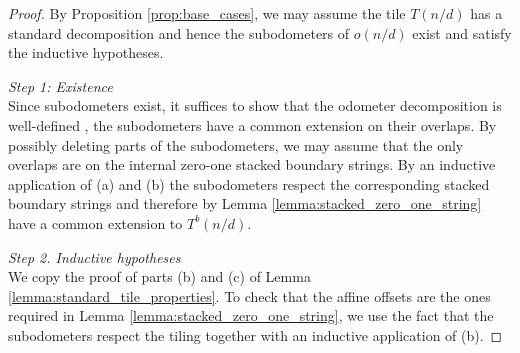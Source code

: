 \documentclass[12pt]{amsart}
\begin{document}
\begin{proof}	
	By Proposition \ref{prop:base_cases}, we may assume the tile $T(n/d)$ has a standard decomposition and hence 
	the subodometers of $o(n/d)$ exist and satisfy the inductive hypotheses. 
	
	{\it Step 1: Existence} \\
	Since subodometers exist, it suffices to show that the odometer decomposition is well-defined \ie, the subodometers
	have a common extension on their overlaps. By possibly deleting parts of the subodometers, 
	we may assume that the only overlaps are on the internal zero-one stacked boundary strings.
	By an inductive application of (a) and (b) the subodometers respect the corresponding stacked boundary strings and therefore
	by Lemma \ref{lemma:stacked_zero_one_string} have a common extension to $T^b(n/d)$. 
	
	
%	

	
	{\it Step 2. Inductive hypotheses} \\
	We copy the proof of parts (b) and (c) of Lemma \ref{lemma:standard_tile_properties}. To check that the affine offsets
	are the ones required in Lemma \ref{lemma:stacked_zero_one_string}, we use the fact that the subodometers respect the tiling together with an inductive application of (b). 
\end{proof}
\end{document}
